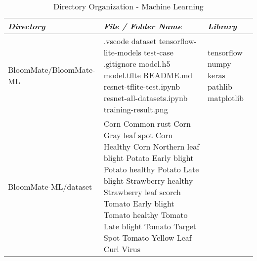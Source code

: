 \documentclass[conference, a4paper]{IEEEtran}
\begin{document}
\begin{table} [htp]
    \caption{Directory Organization - Machine Learning}
    \centering
    \renewcommand{\arraystretch}{1.3}
    \begin{tabular}{p{1.7cm}|p{2.8cm}|p{2.5cm}}
    \hline
    \textit{\textbf{Directory}} & \textit{\textbf{File / Folder Name}} & \textit{\textbf{Library}} \\
     \hline
BloomMate\newline /BloomMate-ML & .vscode \newline dataset \newline tensorflow-lite-models \newline test-case \newline .gitignore \newline model.h5 \newline model.tflte \newline README.md \newline resnet-tflite-test.ipynb \newline resnet-all-datasets.ipynb \newline training-result.png & tensorflow \newline
numpy \newline keras \newline pathlib \newline matplotlib \\
\hline
BloomMate-ML\newline/dataset & Corn Common rust \newline Corn Gray leaf spot \newline Corn Healthy \newline Corn Northern leaf blight \newline Potato Early blight \newline Potato healthy \newline Potato Late blight \newline Strawberry healthy \newline Strawberry leaf scorch \newline Tomato Early blight
 \newline Tomato healthy \newline Tomato Late blight \newline Tomato Target Spot \newline Tomato Yellow Leaf Curl Virus & \\
 \hline
    \end{tabular}
\end{table}
\newpage
\end{document}
